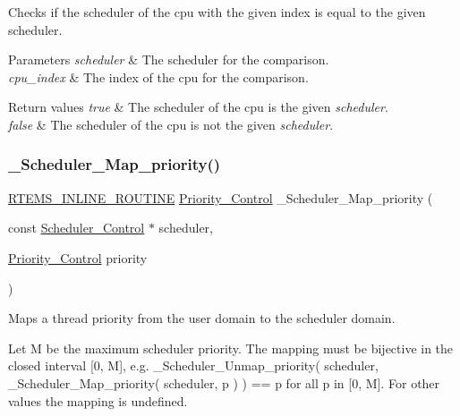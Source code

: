 Checks if the scheduler of the cpu with the given index is equal to the given scheduler. 


\begin{DoxyParams}{Parameters}
{\em scheduler} & The scheduler for the comparison. \\
\hline
{\em cpu\+\_\+index} & The index of the cpu for the comparison.\\
\hline
\end{DoxyParams}

\begin{DoxyRetVals}{Return values}
{\em true} & The scheduler of the cpu is the given {\itshape scheduler}. \\
\hline
{\em false} & The scheduler of the cpu is not the given {\itshape scheduler}. \\
\hline
\end{DoxyRetVals}
\mbox{\label{group__RTEMSScoreScheduler_ga01bd5513405dcafef3306676c55959c6}} 
\subsubsection{\texorpdfstring{\_Scheduler\_Map\_priority()}{\_Scheduler\_Map\_priority()}}
{\footnotesize\ttfamily \mbox{\hyperlink{group__RTEMSScoreBaseDefs_gac216239df231d5dbd15e3520b0b9313f}{R\+T\+E\+M\+S\+\_\+\+I\+N\+L\+I\+N\+E\+\_\+\+R\+O\+U\+T\+I\+NE}} \mbox{\hyperlink{group__RTEMSScorePriority_ga59d02b58072d31a9a1cfe644557aefe2}{Priority\+\_\+\+Control}} \+\_\+\+Scheduler\+\_\+\+Map\+\_\+priority (\begin{DoxyParamCaption}\item[{const \mbox{\hyperlink{struct__Scheduler__Control}{Scheduler\+\_\+\+Control}} $\ast$}]{scheduler,  }\item[{\mbox{\hyperlink{group__RTEMSScorePriority_ga59d02b58072d31a9a1cfe644557aefe2}{Priority\+\_\+\+Control}}}]{priority }\end{DoxyParamCaption})}



Maps a thread priority from the user domain to the scheduler domain. 

Let M be the maximum scheduler priority. The mapping must be bijective in the closed interval \mbox{[}0, M\mbox{]}, e.\+g. \+\_\+\+Scheduler\+\_\+\+Unmap\+\_\+priority( scheduler, \+\_\+\+Scheduler\+\_\+\+Map\+\_\+priority( scheduler, p ) ) == p for all p in \mbox{[}0, M\mbox{]}. For other values the mapping is undefined.


